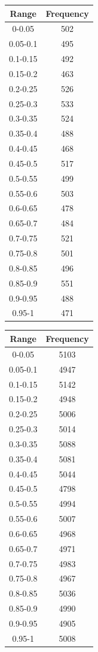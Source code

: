\documentclass{article}
\begin{document}
\begin{table}
{}
\parbox{.3\linewidth}{
 \begin{tabular}{||c | c||}  \hline
		Range & Frequency \\ [0.5ex] \hline \hline0-0.05 & 502\\
		\hline 
		0.05-0.1 & 495\\
		\hline 
		0.1-0.15 & 492\\
		\hline 
		0.15-0.2 & 463\\
		\hline 
		0.2-0.25 & 526\\
		\hline 
		0.25-0.3 & 533\\
		\hline 
		0.3-0.35 & 524\\
		\hline 
		0.35-0.4 & 488\\
		\hline 
		0.4-0.45 & 468\\
		\hline 
		0.45-0.5 & 517\\
		\hline 
		0.5-0.55 & 499\\
		\hline 
		0.55-0.6 & 503\\
		\hline 
		0.6-0.65 & 478\\
		\hline 
		0.65-0.7 & 484\\
		\hline 
		0.7-0.75 & 521\\
		\hline 
		0.75-0.8 & 501\\
		\hline 
		0.8-0.85 & 496\\
		\hline 
		0.85-0.9 & 551\\
		\hline 
		0.9-0.95 & 488\\
		\hline 
		0.95-1 & 471\\
		\hline 
	\end{tabular} 

}
\parbox{.3\linewidth}{
 \begin{tabular}{||c | c||}  \hline
		Range & Frequency \\ [0.5ex] \hline \hline0-0.05 & 5103\\
		\hline 
		0.05-0.1 & 4947\\
		\hline 
		0.1-0.15 & 5142\\
		\hline 
		0.15-0.2 & 4948\\
		\hline 
		0.2-0.25 & 5006\\
		\hline 
		0.25-0.3 & 5014\\
		\hline 
		0.3-0.35 & 5088\\
		\hline 
		0.35-0.4 & 5081\\
		\hline 
		0.4-0.45 & 5044\\
		\hline 
		0.45-0.5 & 4798\\
		\hline 
		0.5-0.55 & 4994\\
		\hline 
		0.55-0.6 & 5007\\
		\hline 
		0.6-0.65 & 4968\\
		\hline 
		0.65-0.7 & 4971\\
		\hline 
		0.7-0.75 & 4983\\
		\hline 
		0.75-0.8 & 4967\\
		\hline 
		0.8-0.85 & 5036\\
		\hline 
		0.85-0.9 & 4990\\
		\hline 
		0.9-0.95 & 4905\\
		\hline 
		0.95-1 & 5008\\
		\hline 
	\end{tabular} 
}
\end{table}
\end{document}
